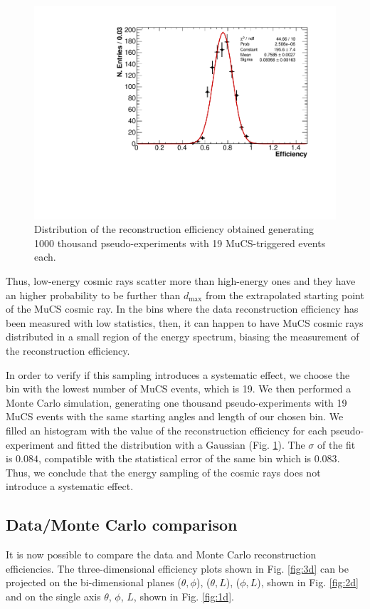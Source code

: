 \documentclass[a4paper]{scrartcl}
\begin{document}
\begin{figure}[htbp]
  \begin{center}
    \includegraphics[width=0.7\linewidth]{figures/sampling.pdf}
    \caption{Distribution of the reconstruction efficiency obtained generating 1000 thousand pseudo-experiments with 19 MuCS-triggered events each.} \label{fig:sampling}
  \end{center}
\end{figure}

Thus, low-energy cosmic rays scatter more than high-energy ones and they have an higher probability to be further than $d_{\mathrm{max}}$ from the extrapolated starting point of the MuCS cosmic ray. In the bins where the data reconstruction efficiency has been measured with low statistics, then, it can happen to have MuCS cosmic rays distributed in a small region of the energy spectrum, biasing the measurement of the reconstruction efficiency.

In order to verify if this sampling introduces a systematic effect, we choose the bin with the lowest number of MuCS events, which is 19. We then performed a Monte Carlo simulation, generating one thousand pseudo-experiments with 19 MuCS events with the same starting angles and length of our chosen bin. We filled an histogram with the value of the reconstruction efficiency for each pseudo-experiment and fitted the distribution with a Gaussian (Fig. \ref{fig:sampling}). The $\sigma$ of the fit is $0.084$, compatible with the statistical error of the same bin which is $0.083$. Thus, we conclude that the energy sampling of the cosmic rays does not introduce a systematic effect.

\subsection{Data/Monte Carlo comparison}
It is now possible to compare the data and Monte Carlo reconstruction efficiencies. The three-dimensional efficiency plots shown in Fig. \ref{fig:3d} can be projected on the bi-dimensional planes ($\theta,\phi$), ($\theta,L$), ($\phi,L$), shown in Fig. \ref{fig:2d} and on the single axis $\theta$, $\phi$, $L$, shown in Fig. \ref{fig:1d}.
\end{document}
